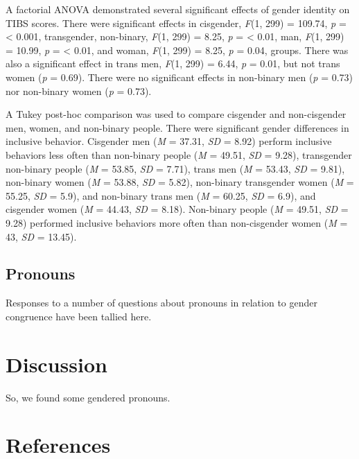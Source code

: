 \documentclass[12pt,twoside]{reedthesis}
\begin{document}
A factorial ANOVA demonstrated several significant effects of gender identity on TIBS scores. There were significant effects in cisgender, \emph{F}(1, 299) = 109.74, \emph{p} = \textless{} 0.001, transgender, non-binary, \emph{F}(1, 299) = 8.25, \emph{p} = \textless{} 0.01, man, \emph{F}(1, 299) = 10.99, \emph{p} = \textless{} 0.01, and woman, \emph{F}(1, 299) = 8.25, \emph{p} = 0.04, groups. There was also a significant effect in trans men, \emph{F}(1, 299) = 6.44, \emph{p} = 0.01, but not trans women (\emph{p} = 0.69). There were no significant effects in non-binary men (\emph{p} = 0.73) nor non-binary women (\emph{p} = 0.73).

A Tukey post-hoc comparison was used to compare cisgender and non-cisgender men, women, and non-binary people. There were significant gender differences in inclusive behavior. Cisgender men (\emph{M} = 37.31, \emph{SD} = 8.92) perform inclusive behaviors less often than non-binary people (\emph{M} = 49.51, \emph{SD} = 9.28), transgender non-binary people (\emph{M} = 53.85, \emph{SD} = 7.71), trans men (\emph{M} = 53.43, \emph{SD} = 9.81), non-binary women (\emph{M} = 53.88, \emph{SD} = 5.82), non-binary transgender women (\emph{M} = 55.25, \emph{SD} = 5.9), and non-binary trans men (\emph{M} = 60.25, \emph{SD} = 6.9), and cisgender women (\emph{M} = 44.43, \emph{SD} = 8.18).
Non-binary people (\emph{M} = 49.51, \emph{SD} = 9.28) performed inclusive behaviors more often than non-cisgender women (\emph{M} = 43, \emph{SD} = 13.45).

\hypertarget{pronouns}{%
\section{Pronouns}\label{pronouns}}

Responses to a number of questions about pronouns in relation to gender congruence have been tallied here.

\hypertarget{discussion}{%
\chapter{Discussion}\label{discussion}}

So, we found some gendered pronouns.

\appendix

\backmatter

\hypertarget{references}{%
\chapter*{References}\label{references}}
\end{document}
